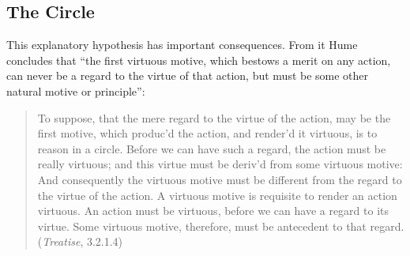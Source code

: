 

\subsection{The Circle}\label{sec:the_circle} %

This explanatory hypothesis has important consequences. From it Hume concludes that ``the first virtuous motive, which bestows a merit on any action, can never be a regard to the virtue of that action, but must be some other natural motive or principle'':
\begin{quote}
    To suppose, that the mere regard to the virtue of the action, may be the first motive, which produc’d the action, and render’d it virtuous, is to reason in a circle. Before we can have such a regard, the action must be really virtuous; and this virtue must be deriv’d from some virtuous motive: And consequently the virtuous motive must be different from the regard to the virtue of the action. A virtuous motive is requisite to render an action virtuous. An action must be virtuous, before we can have a regard to its virtue. Some virtuous motive, therefore, must be antecedent to that regard. (\emph{Treatise}, 3.2.1.4)
\end{quote}

